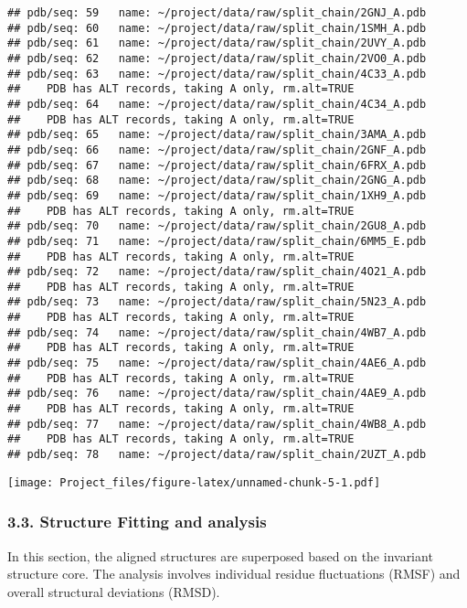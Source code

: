 \documentclass[
]{article}
\begin{document}
\begin{verbatim}
## pdb/seq: 59   name: ~/project/data/raw/split_chain/2GNJ_A.pdb 
## pdb/seq: 60   name: ~/project/data/raw/split_chain/1SMH_A.pdb 
## pdb/seq: 61   name: ~/project/data/raw/split_chain/2UVY_A.pdb 
## pdb/seq: 62   name: ~/project/data/raw/split_chain/2VO0_A.pdb 
## pdb/seq: 63   name: ~/project/data/raw/split_chain/4C33_A.pdb 
##    PDB has ALT records, taking A only, rm.alt=TRUE
## pdb/seq: 64   name: ~/project/data/raw/split_chain/4C34_A.pdb 
##    PDB has ALT records, taking A only, rm.alt=TRUE
## pdb/seq: 65   name: ~/project/data/raw/split_chain/3AMA_A.pdb 
## pdb/seq: 66   name: ~/project/data/raw/split_chain/2GNF_A.pdb 
## pdb/seq: 67   name: ~/project/data/raw/split_chain/6FRX_A.pdb 
## pdb/seq: 68   name: ~/project/data/raw/split_chain/2GNG_A.pdb 
## pdb/seq: 69   name: ~/project/data/raw/split_chain/1XH9_A.pdb 
##    PDB has ALT records, taking A only, rm.alt=TRUE
## pdb/seq: 70   name: ~/project/data/raw/split_chain/2GU8_A.pdb 
## pdb/seq: 71   name: ~/project/data/raw/split_chain/6MM5_E.pdb 
##    PDB has ALT records, taking A only, rm.alt=TRUE
## pdb/seq: 72   name: ~/project/data/raw/split_chain/4O21_A.pdb 
##    PDB has ALT records, taking A only, rm.alt=TRUE
## pdb/seq: 73   name: ~/project/data/raw/split_chain/5N23_A.pdb 
##    PDB has ALT records, taking A only, rm.alt=TRUE
## pdb/seq: 74   name: ~/project/data/raw/split_chain/4WB7_A.pdb 
##    PDB has ALT records, taking A only, rm.alt=TRUE
## pdb/seq: 75   name: ~/project/data/raw/split_chain/4AE6_A.pdb 
##    PDB has ALT records, taking A only, rm.alt=TRUE
## pdb/seq: 76   name: ~/project/data/raw/split_chain/4AE9_A.pdb 
##    PDB has ALT records, taking A only, rm.alt=TRUE
## pdb/seq: 77   name: ~/project/data/raw/split_chain/4WB8_A.pdb 
##    PDB has ALT records, taking A only, rm.alt=TRUE
## pdb/seq: 78   name: ~/project/data/raw/split_chain/2UZT_A.pdb
\end{verbatim}

\texttt{[image: Project\_files/figure-latex/unnamed-chunk-5-1.pdf]}

\hypertarget{structure-fitting-and-analysis}{%
\subsubsection{3.3. Structure Fitting and
analysis}\label{structure-fitting-and-analysis}}

In this section, the aligned structures are superposed based on the
invariant structure core. The analysis involves individual residue
fluctuations (RMSF) and overall structural deviations (RMSD).
\end{document}
